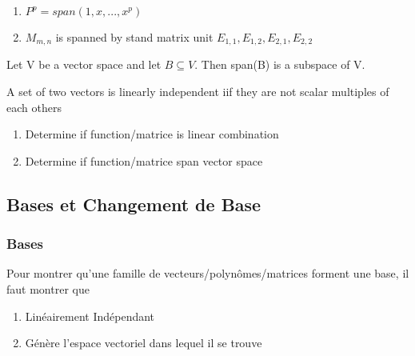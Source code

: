 \documentclass{article}
\begin{document}
\begin{proposition}
    \begin{enumerate}
	\item $ P^p = span(1,x, ..., x^p) $
	\item $M_{m,n}$ is spanned by stand matrix unit $E_{1,1},
	    E_{1,2}, E_{2,1}, E_{2,2} $
    \end{enumerate}
\end{proposition}

\begin{theorem}
    Let V be a vector space and let $ B \subseteq V$. Then span(B) is
    a subspace of V.
\end{theorem}

\begin{definition}
    A set of two vectors is linearly independent iif they are not scalar
    multiples of each others
\end{definition}

\begin{problem}
    \begin{enumerate}
        \item Determine if function/matrice is linear combination
	\item Determine if function/matrice span vector space
    \end{enumerate}
\end{problem}

\subsection{Bases et Changement de Base}%
\label{sub:Bases et Changement de Base}

\subsubsection{Bases}%
\label{ssub:Bases}

Pour montrer qu'une famille de vecteurs/polynômes/matrices forment
une base, il faut montrer que
\begin{enumerate}
    \item Linéairement Indépendant
    \item Génère l'espace vectoriel dans lequel il se trouve
\end{enumerate}
\end{document}
